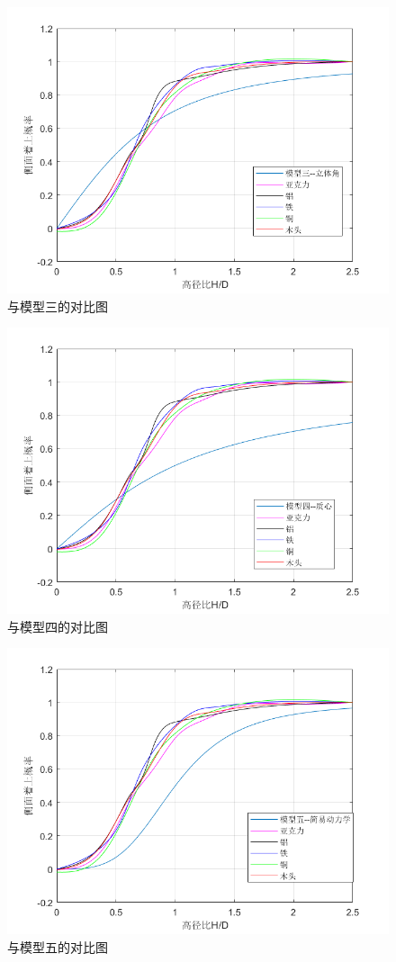 \documentclass[UTF8]{gapd}
\begin{document}
\begin{figure}[h]%
	\centering
	\includegraphics[width=1\columnwidth]{images/比较3}
	\caption{与模型三的对比图}
	\label{fig:P2}%
\end{figure}
\begin{figure}[h]%
	\centering
	\includegraphics[width=1\columnwidth]{images/比较4}
	\caption{与模型四的对比图}
	\label{fig:P2}%
\end{figure}
\begin{figure}[h]%
	\centering
	\includegraphics[width=1\columnwidth]{images/比较5}
	\caption{与模型五的对比图}
	\label{fig:P2}%
\end{figure}
\end{document}
